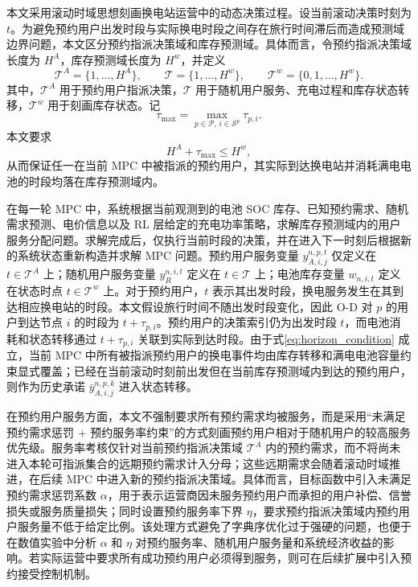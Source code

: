 \documentclass[12pt,hyperref,a4paper,UTF8]{ctexart}
\begin{document}
本文采用滚动时域思想刻画换电站运营中的动态决策过程。设当前滚动决策时刻为 $t$。为避免预约用户出发时段与实际换电时段之间存在旅行时间滞后而造成预测域边界问题，本文区分预约指派决策域和库存预测域。具体而言，令预约指派决策域长度为 $H^A$，库存预测域长度为 $H^w$，并定义
\begin{equation}
\mathcal{T}^{A}=\{1,\ldots,H^A\},\qquad
\mathcal{T}=\{1,\ldots,H^w\},\qquad
\mathcal{T}^{w}=\{0,1,\ldots,H^w\}.
\label{eq:horizon_sets}
\end{equation}
其中，$\mathcal{T}^{A}$ 用于预约用户指派决策，$\mathcal{T}$ 用于随机用户服务、充电过程和库存状态转移，$\mathcal{T}^{w}$ 用于刻画库存状态。记
\begin{equation}
\tau_{\max}=\max_{p\in\mathcal{P},\,i\in\mathcal{S}^{p}}\tau_{p,i}.
\label{eq:tau_max}
\end{equation}
本文要求
\begin{equation}
H^A+\tau_{\max}\le H^w,
\label{eq:horizon_condition}
\end{equation}
从而保证任一在当前 MPC 中被指派的预约用户，其实际到达换电站并消耗满电电池的时段均落在库存预测域内。

在每一轮 MPC 中，系统根据当前观测到的电池 SOC 库存、已知预约需求、随机需求预测、电价信息以及 RL 层给定的充电功率策略，求解库存预测域内的用户服务分配问题。求解完成后，仅执行当前时段的决策，并在进入下一时刻后根据新的系统状态重新构造并求解 MPC 问题。预约用户服务变量 $y_{A,i,j}^{n,p,t}$ 仅定义在 $t\in\mathcal{T}^{A}$ 上；随机用户服务变量 $y_R^{n,i,t}$ 定义在 $t\in\mathcal{T}$ 上；电池库存变量 $w_{n,i,t}$ 定义在状态时点 $t\in\mathcal{T}^{w}$ 上。对于预约用户，$t$ 表示其出发时段，换电服务发生在其到达相应换电站的时段。本文假设旅行时间不随出发时段变化，因此 O-D 对 $p$ 的用户到达节点 $i$ 的时段为 $t+\tau_{p,i}$。预约用户的决策索引仍为出发时段 $t$，而电池消耗和状态转移通过 $t+\tau_{p,i}$ 关联到实际到达时段。由于式\eqref{eq:horizon_condition} 成立，当前 MPC 中所有被指派预约用户的换电事件均由库存转移和满电电池容量约束显式覆盖；已经在当前滚动时刻前出发但在当前库存预测域内到达的预约用户，则作为历史承诺 $\bar{y}_{A,i,j}^{n,p,k}$ 进入状态转移。

在预约用户服务方面，本文不强制要求所有预约需求均被服务，而是采用“未满足预约需求惩罚 + 预约服务率约束”的方式刻画预约用户相对于随机用户的较高服务优先级。服务率考核仅针对当前预约指派决策域 $\mathcal{T}^{A}$ 内的预约需求，而不将尚未进入本轮可指派集合的远期预约需求计入分母；这些远期需求会随着滚动时域推进，在后续 MPC 中进入新的预约指派决策域。具体而言，目标函数中引入未满足预约需求惩罚系数 $\alpha$，用于表示运营商因未服务预约用户而承担的用户补偿、信誉损失或服务质量损失；同时设置预约服务率下界 $\eta$，要求预约指派决策域内预约用户服务量不低于给定比例。该处理方式避免了字典序优化过于强硬的问题，也便于在数值实验中分析 $\alpha$ 和 $\eta$ 对预约服务率、随机用户服务量和系统经济收益的影响。若实际运营中要求所有成功预约用户必须得到服务，则可在后续扩展中引入预约接受控制机制。
\end{document}
